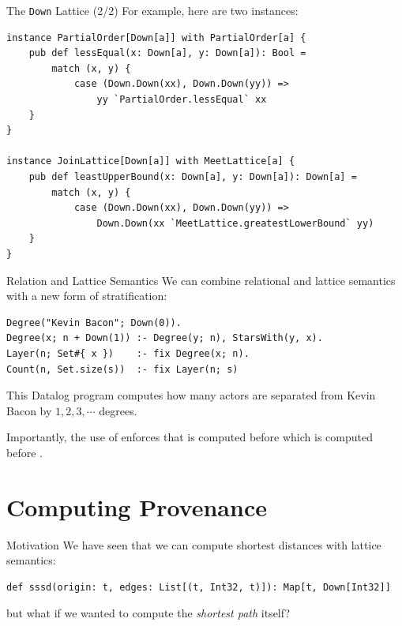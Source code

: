 \begin{frame}[fragile]{The \texttt{Down} Lattice (2/2)}
For example, here are two instances:

\begin{lstlisting}[language=flix, xleftmargin=0.4cm]
instance PartialOrder[Down[a]] with PartialOrder[a] {
    pub def lessEqual(x: Down[a], y: Down[a]): Bool = 
        match (x, y) {
            case (Down.Down(xx), Down.Down(yy)) => 
                yy `PartialOrder.lessEqual` xx
    }
}

instance JoinLattice[Down[a]] with MeetLattice[a] {
    pub def leastUpperBound(x: Down[a], y: Down[a]): Down[a] = 
        match (x, y) {
            case (Down.Down(xx), Down.Down(yy)) => 
                Down.Down(xx `MeetLattice.greatestLowerBound` yy)
    }
}
\end{lstlisting}
\end{frame}

\begin{frame}[fragile]{Relation and Lattice Semantics}
We can combine relational and lattice semantics with a new form of
stratification: 

\begin{lstlisting}[language=flix, xleftmargin=0.8cm]
Degree("Kevin Bacon"; Down(0)).
Degree(x; n + Down(1)) :- Degree(y; n), StarsWith(y, x).
Layer(n; Set#{ x })    :- fix Degree(x; n).
Count(n, Set.size(s))  :- fix Layer(n; s)
\end{lstlisting}

This Datalog program computes how many actors are separated from Kevin Bacon by
$1, 2, 3, \cdots$ degrees. 

Importantly, the use of  enforces that  is computed
before  which is computed before .
\end{frame}

\section{Computing Provenance}

\begin{frame}[fragile]{Motivation}
We have seen that we can compute shortest distances with lattice semantics: 

\begin{lstlisting}[language=flix, xleftmargin=0.8cm]
def sssd(origin: t, edges: List[(t, Int32, t)]): Map[t, Down[Int32]]
\end{lstlisting}

but what if we wanted to compute the \emph{shortest path} itself?
\end{frame}

